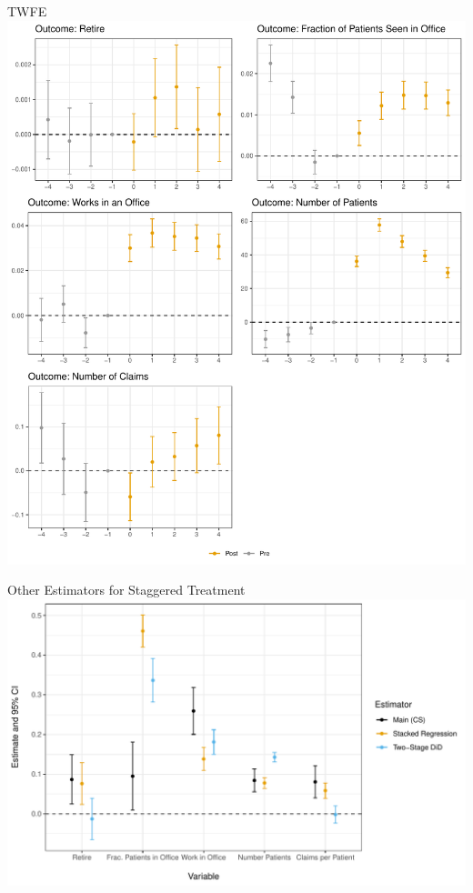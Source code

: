 \documentclass[notes,11pt, aspectratio=169]{beamer}
\begin{document}
\begin{frame}[noframenumbering]{TWFE}
\label{TWFE}
\centering
    \includegraphics[scale=.3]{Objects/twfe_plot.pdf}
    \hyperlink{Robustness}{}
\end{frame}

\begin{frame}[noframenumbering]{Other Estimators for Staggered Treatment}
\label{Other Estimators for Staggered Treatment}
\centering
    \includegraphics[scale=.45]{Objects/estimators_plot.pdf}
    \hyperlink{Robustness}{}
\end{frame}
\end{document}
